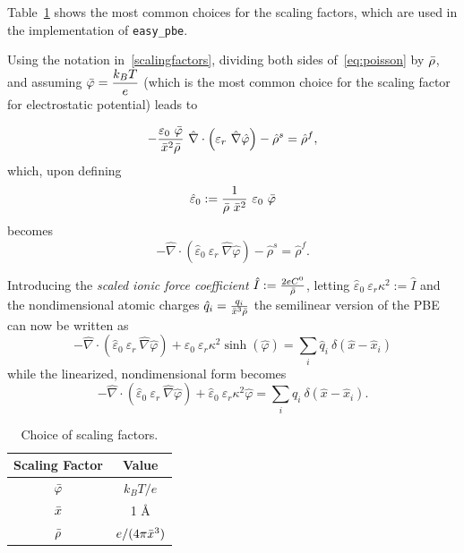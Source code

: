 \documentclass[11pt,a4paper]{article}
\begin{document}
Table~\ref{table:scalingfacts} shows the most common choices for the scaling factors, which
are used in the implementation of {\tt easy\_pbe}.

Using the notation in~\eqref{scalingfactors}, dividing both sides of~\eqref{eq:poisson} by $\Bar{\rho}$, and assuming $\Bar{\varphi} = \dfrac{k_B T}{e}$ (which is the most common choice
for the scaling factor for electrostatic potential) leads to 

\begin{equation}
    -\frac{\varepsilon_0\ \Bar{\varphi}}{\Bar{x}^2 \Bar{\rho}}\ 
    \hat{\nabla} \cdot \left( \varepsilon_r\ 
    \hat{\nabla} \hat{\varphi} 
    \right) -  \hat{\rho}^s
        =  \hat{\rho}^f,
\end{equation}
which, upon defining 
$$ \hat{\varepsilon}_0 := \frac{1}{\Bar{\rho}\ \Bar{x}^2}\ \varepsilon_0\ \Bar{\varphi} $$
becomes
\begin{equation}
- \hat{\nabla} \cdot \left( \hat{\varepsilon}_0\
 \varepsilon_r\ 
    \hat{\nabla} \hat{\varphi} 
    \right) - \hat{\rho}^s
    = \hat{\rho}^f.
\end{equation}

Introducing the \emph{scaled ionic force coefficient} $\hat{I} := \frac{2eC^0}{\Bar{\rho}}$, 
letting $ \hat{\varepsilon}_0\ \varepsilon_r \kappa^2 := \hat{I}$
and the nondimensional atomic charges $\hat{q}_i = \frac{q_i}{\Bar{x}^3 \Bar{\rho}}$
the semilinear version of the PBE can now be written as
$$
- \hat{\nabla} \cdot \left( \hat{\varepsilon}_0\
 \varepsilon_r\ 
    \hat{\nabla} \hat{\varphi} 
    \right) +  \hat{\varepsilon}_0\ \varepsilon_r \kappa^2 \sinh\left(\hat{\varphi}\right)
    = \displaystyle \sum_i \hat{q}_i\ \delta (\hat{x} - \hat{x}_i)
$$
while the linearized, nondimensional form becomes
\begin{equation}
    - \hat{\nabla} \cdot \left( \hat{\varepsilon}_0\
 \varepsilon_r\ 
    \hat{\nabla} \hat{\varphi} 
    \right) +  \hat{\varepsilon}_0\ \varepsilon_r \kappa^2 \hat{\varphi}
    = \displaystyle \sum_i \hat{q}_i\ \delta (\hat{x} - \hat{x}_i).
    \label{eq:adimensionalpbe}
\end{equation}

\begin{table}
\centering 
    \begin{tabular}{| c | c |}
    \hline
     \rowcolor{bluePoli!40}
      \textbf{Scaling Factor} & \textbf{Value}  \T\B \\
    \hline 
    $\Bar{\varphi}$ & $k_BT / e$ 
    \T\B\\
    $\Bar{x}$  & 1 \AA 
    \T\B\\
    $\Bar{\rho}$  & $e / (4 \pi \Bar{x}^3)$
    \B\\
    \hline
    \end{tabular}
    \\[10pt]
    \caption{Choice of scaling factors.}
    \label{table:scalingfacts}
\end{table}
\end{document}
